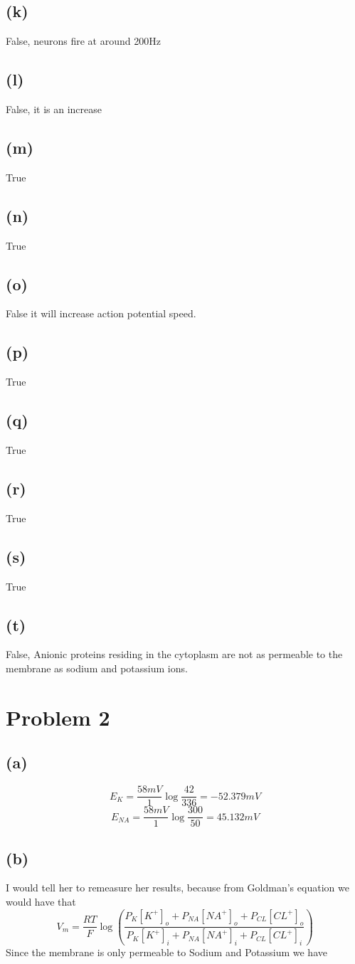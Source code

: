 \documentclass[12pt]{article}
\begin{document}
\subsection*{(k)}
False, neurons fire at around 200Hz
\subsection*{(l)}
False, it is an increase
\subsection*{(m)}
True
\subsection*{(n)}
True
\subsection*{(o)}
False it will increase action potential speed.
\subsection*{(p)}
True
\subsection*{(q)}
True
\subsection*{(r)}
True
\subsection*{(s)}
True
\subsection*{(t)}
False, Anionic proteins residing in the cytoplasm are not as permeable to the membrane as sodium
and potassium ions.
\section*{Problem 2}
\subsection*{(a)}
$$E_K=\frac{58mV}{1}\log\frac{42}{336}=-52.379mV$$
$$E_{NA}=\frac{58mV}{1}\log\frac{300}{50}=45.132mV$$
\subsection*{(b)}
I would tell her to remeasure her results, because from Goldman's equation we would have that
$$V_m=\frac{RT}{F}\log\left(\frac{P_K[K^+]_o +P_{NA}[NA^+]_o+P_{CL}[CL^+]_o}{P_K[K^+]_i +P_{NA}[NA^+]_i+P_{CL}[CL^+]_i}\right)$$
Since the membrane is only permeable to Sodium and Potassium we have
\end{document}
